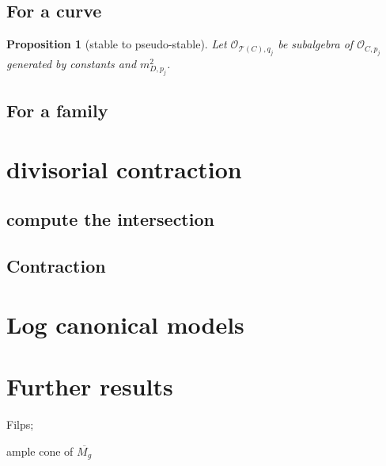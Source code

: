 \documentclass{article}
\newtheorem{prop}[defn]{Proposition}
\begin{document}
\subsection{For a curve}
\begin{prop}[stable to pseudo-stable]
	Let $ \mathcal{O}_{\mathcal{T}(C),q_{j}} $ be subalgebra of $  \mathcal{O}_{C,p_{j}} $ generated by constants and $ m_{D,p_{j}}^{2}$.
\end{prop}
\subsection{For a family}

\section{ divisorial contraction}

\subsection{compute the intersection}

\subsection{Contraction}

\section{Log canonical models}

\section{Further results}
Filps;

ample cone of $ \overline{M_g} $
\end{document}
